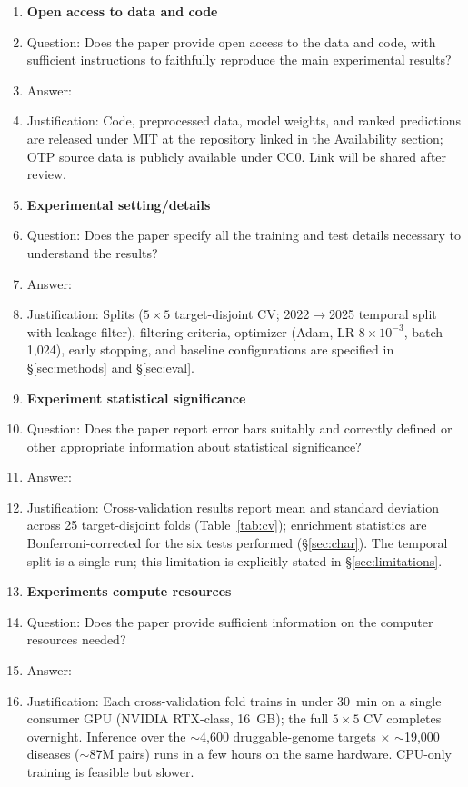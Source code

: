\begin{enumerate}
\item {\bf Open access to data and code}
    \item[] Question: Does the paper provide open access to the data and code, with sufficient instructions to faithfully reproduce the main experimental results?
    \item[] Answer: \answerYes{}
    \item[] Justification: Code, preprocessed data, model weights, and ranked predictions are released under MIT at the repository linked in the Availability section; OTP source data is publicly available under CC0. Link will be shared after review.

\item {\bf Experimental setting/details}
    \item[] Question: Does the paper specify all the training and test details necessary to understand the results?
    \item[] Answer: \answerYes{}
    \item[] Justification: Splits ($5{\times}5$ target-disjoint CV; 2022$\to$2025 temporal split with leakage filter), filtering criteria, optimizer (Adam, LR $8{\times}10^{-3}$, batch 1{,}024), early stopping, and baseline configurations are specified in \S\ref{sec:methods} and \S\ref{sec:eval}.

\item {\bf Experiment statistical significance}
    \item[] Question: Does the paper report error bars suitably and correctly defined or other appropriate information about statistical significance?
    \item[] Answer: \answerYes{}
    \item[] Justification: Cross-validation results report mean and standard deviation across 25 target-disjoint folds (Table~\ref{tab:cv}); enrichment statistics are Bonferroni-corrected for the six tests performed (\S\ref{sec:char}). The temporal split is a single run; this limitation is explicitly stated in \S\ref{sec:limitations}.

\item {\bf Experiments compute resources}
    \item[] Question: Does the paper provide sufficient information on the computer resources needed?
    \item[] Answer: \answerYes{}
    \item[] Justification: Each cross-validation fold trains in under 30~min on a single consumer GPU (NVIDIA RTX-class, 16~GB); the full $5{\times}5$ CV completes overnight. Inference over the $\sim$4{,}600 druggable-genome targets $\times$ $\sim$19{,}000 diseases ($\sim$87M pairs) runs in a few hours on the same hardware. CPU-only training is feasible but slower.


\end{enumerate}
